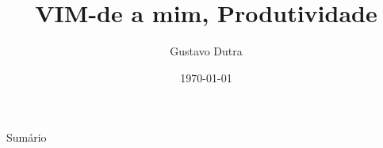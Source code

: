 \documentclass{beamer}
\title{VIM-de a mim, Produtividade}
\author{Gustavo Dutra}
\institute{http://gustavodutra.com}
\date{\today}
\begin{document}
\begin{frame}
\titlepage
\end{frame}

\begin{frame}{Sumário}
	\tableofcontents
\end{frame}













\end{document}
